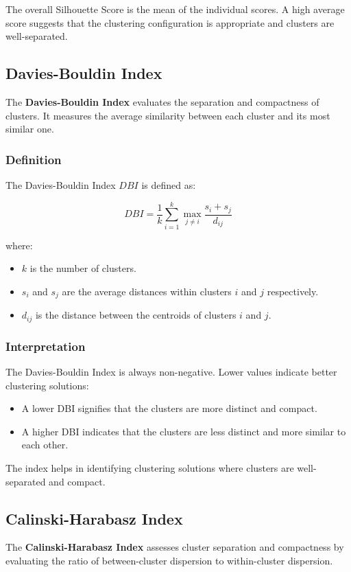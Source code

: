 The overall Silhouette Score is the mean of the individual scores. A high average score suggests that the clustering configuration is appropriate and clusters are well-separated.

\subsection*{Davies-Bouldin Index}
The \textbf{Davies-Bouldin Index} evaluates the separation and compactness of clusters. It measures the average similarity between each cluster and its most similar one.

\subsubsection*{Definition}
The Davies-Bouldin Index \(DBI\) is defined as:

\[
DBI = \frac{1}{k} \sum_{i=1}^{k} \max_{j \neq i} \frac{s_i + s_j}{d_{ij}}
\]

where:
\begin{itemize}
    \item \(k\) is the number of clusters.
    \item \(s_i\) and \(s_j\) are the average distances within clusters \(i\) and \(j\) respectively.
    \item \(d_{ij}\) is the distance between the centroids of clusters \(i\) and \(j\).
\end{itemize}

\subsubsection*{Interpretation}
The Davies-Bouldin Index is always non-negative. Lower values indicate better clustering solutions:
\begin{itemize}
    \item A lower DBI signifies that the clusters are more distinct and compact.
    \item A higher DBI indicates that the clusters are less distinct and more similar to each other.
\end{itemize}

The index helps in identifying clustering solutions where clusters are well-separated and compact.

\subsection*{Calinski-Harabasz Index}
The \textbf{Calinski-Harabasz Index} assesses cluster separation and compactness by evaluating the ratio of between-cluster dispersion to within-cluster dispersion.

